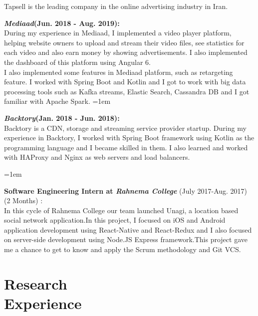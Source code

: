 \documentclass[line, mm]{sampleCV}
\begin{document}
\begin{resume}
\begin{list2}
Tapsell is the leading company in the online advertising industry in Iran.
\begin{list2}
\item \textbf{ \textit{Mediaad}(Jun. 2018 - Aug. 2019):}\\
During my experience in Mediaad, I implemented a video player platform, helping website owners to upload and stream their video files, see statistics for each video and also earn money by showing advertisements. I also implemented the dashboard of this platform using Angular 6.\\
I also implemented some features in Mediaad platform, such as retargeting feature. 
I worked with Spring Boot and Kotlin and I got to work with big data processing tools such as Kafka streams, Elastic Search, Cassandra DB and I got familiar with Apache Spark.
\hangindent=1em
\item \textbf{\textit{Backtory}(Jan. 2018 - Jun. 2018):}\\	
Backtory is a CDN, storage and streaming service provider startup. 
During my experience in Backtory, I worked with Spring Boot framework using Kotlin as the programming language and I became skilled in them. 
I also learned and worked with HAProxy and Nginx as web servers and load balancers.

\end{list2}

\hangindent=1em
\item \textbf{Software Engineering Intern at \textit{Rahnema College}} (July 2017-Aug. 2017) (2 Months) : \\
 In this cycle of Rahnema College our team launched Unagi, a location based social network application.In this project, I focused on iOS and Android application development using React-Native and React-Redux	 and I also focused on server-side development using Node.JS Express framework.This project gave me a chance to get to know and apply the Scrum methodology and Git VCS.



\end{list2}

\section{\mysidestyle Research\\Experience} 


\end{resume}
\end{document}
